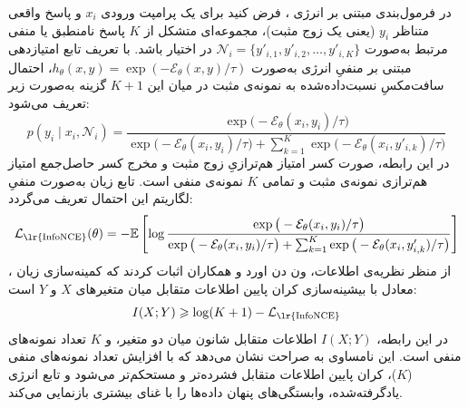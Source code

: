 در فرمول‌بندی مبتنی بر انرژی ، فرض کنید برای یک پرامپت ورودی $x_i$ و پاسخ واقعی متناظر $y_i$ (یعنی یک زوج مثبت)، مجموعه‌ای متشکل از $K$ پاسخ نامنطبق یا منفی مرتبط به‌صورت $\mathcal{N}_i = \{y'_{i, 1}, y'_{i, 2}, \dots, y'_{i, K}\}$ در اختیار باشد. با تعریف تابع امتیازدهی مبتنی بر منفیِ انرژی به‌صورت $h_\theta(x, y) = \exp(-\mathcal{E}_\theta(x, y) / \tau)$، احتمال سافت‌مکسِ نسبت‌داده‌شده به نمونه‌ی مثبت در میان این $K+1$ گزینه به‌صورت زیر تعریف می‌شود:
\begin{equation}\label{eq:chap2_infonce_prob_def}
    p(y_i \mid x_i, \mathcal{N}_i) = \frac{\exp\big(-\mathcal{E}_\theta(x_i, y_i)/\tau\big)}{\exp\big(-\mathcal{E}_\theta(x_i, y_i)/\tau\big) + \sum_{k=1}^K \exp\big(-\mathcal{E}_\theta(x_i, y'_{i, k})/\tau\big)}
\end{equation}
در این رابطه، صورت کسر امتیاز هم‌ترازیِ زوج مثبت و مخرج کسر حاصل‌جمع امتیاز هم‌ترازی نمونه‌ی مثبت و تمامی $K$ نمونه‌ی منفی است. تابع زیان  به‌صورت منفیِ لگاریتم این احتمال تعریف می‌گردد:
\begin{equation}\label{eq:chap2_infonce}
    \mathcal{L}_{\text{\lr{InfoNCE}}}(\theta) = -\mathbb{E} \left[ \log \frac{\exp\big(-\mathcal{E}_\theta(x_i, y_i)/\tau\big)}{\exp\big(-\mathcal{E}_\theta(x_i, y_i)/\tau\big) + \sum_{k=1}^K \exp\big(-\mathcal{E}_\theta(x_i, y'_{i, k})/\tau\big)} \right]
\end{equation}
از منظر نظریه‌ی اطلاعات، ون دن اورد و همکاران اثبات کردند که کمینه‌سازی زیان ، معادل با بیشینه‌سازی کران پایین اطلاعات متقابل میان متغیرهای $X$ و $Y$ است:
\begin{equation}\label{eq:chap2_mutual_info_bound}
    I(X; Y) \ge \log(K + 1) - \mathcal{L}_{\text{\lr{InfoNCE}}}
\end{equation}
در این رابطه، $I(X; Y)$ اطلاعات متقابل شانون میان دو متغیر، و $K$ تعداد نمونه‌های منفی است. این نامساوی به صراحت نشان می‌دهد که با افزایش تعداد نمونه‌های منفی ($K$)، کران پایین اطلاعات متقابل فشرده‌تر و مستحکم‌تر می‌شود و تابع انرژی یادگرفته‌شده، وابستگی‌های پنهان داده‌ها را با غنای بیشتری بازنمایی می‌کند.

